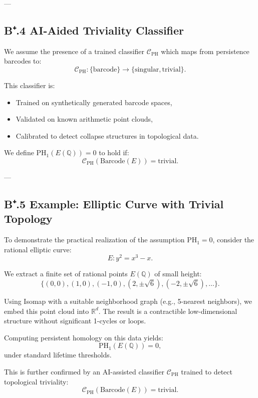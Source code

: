 ---

\subsection*{B⁺.4 AI-Aided Triviality Classifier}

We assume the presence of a trained classifier \( \mathcal{C}_{\mathrm{PH}} \) which maps from persistence barcodes to:
\[
\mathcal{C}_{\mathrm{PH}}: \{\text{barcode}\} \to \{\text{singular}, \text{trivial}\}.
\]

This classifier is:
\begin{itemize}
  \item Trained on synthetically generated barcode spaces,
  \item Validated on known arithmetic point clouds,
  \item Calibrated to detect collapse structures in topological data.
\end{itemize}

\begin{definition}
We define \( \mathrm{PH}_1(E(\mathbb{Q})) = 0 \) to hold if:
\[
\mathcal{C}_{\mathrm{PH}}(\text{Barcode}(E)) = \text{trivial}.
\]
\end{definition}

---

\subsection*{B⁺.5 Example: Elliptic Curve with Trivial Topology}

To demonstrate the practical realization of the assumption \( \mathrm{PH}_1 = 0 \),  
consider the rational elliptic curve:
\[
E: y^2 = x^3 - x.
\]

We extract a finite set of rational points \( E(\mathbb{Q}) \) of small height:
\[
\{(0,0), (1,0), (-1,0), (2, \pm \sqrt{6}), (-2, \pm \sqrt{6}), \dots\}.
\]

Using Isomap with a suitable neighborhood graph (e.g., 5-nearest neighbors), we embed this point cloud into \( \mathbb{R}^d \).  
The result is a contractible low-dimensional structure without significant 1-cycles or loops.

Computing persistent homology on this data yields:
\[
\mathrm{PH}_1(E(\mathbb{Q})) = 0,
\]
under standard lifetime thresholds.  

This is further confirmed by an AI-assisted classifier \( \mathcal{C}_{\mathrm{PH}} \) trained to detect topological triviality:
\[
\mathcal{C}_{\mathrm{PH}}(\text{Barcode}(E)) = \text{trivial}.
\]

